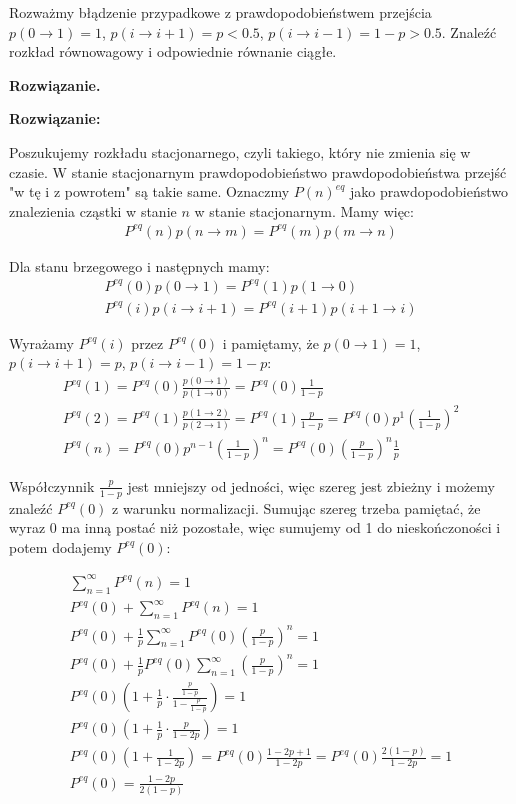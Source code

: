 \documentclass[11pt,a4paper]{article}
\newenvironment{solution}{\vspace{1cm} \par\textbf{Rozwiązanie.} \vspace{1cm}}{}
\begin{document}
Rozważmy błądzenie przypadkowe z prawdopodobieństwem przejścia 
$p(0 \to 1) = 1$, $p(i \to i+1) = p < 0.5$, $p(i \to i-1) = 1-p > 0.5$. 
Znaleźć rozkład równowagowy i odpowiednie równanie ciągłe.

\begin{solution}
    
\vspace{1cm}
{\bf Rozwiązanie:}
\vspace{1cm}

Poszukujemy rozkładu stacjonarnego, czyli takiego, który nie zmienia się w czasie.
W stanie stacjonarnym prawdopodobieństwo prawdopodobieństwa przejść "w tę i z powrotem"
są takie same. Oznaczmy $P(n)^{eq}$ jako prawdopodobieństwo znalezienia cząstki 
w stanie $n$ w stanie stacjonarnym. Mamy więc:
\begin{align*}
    P^{eq}(n) p(n \to m) = P^{eq}(m) p(m \to n)
\end{align*}

Dla stanu brzegowego i następnych mamy:
\begin{align*}
    P^{eq}(0) p(0 \to 1) = P^{eq}(1) p(1 \to 0) \\
    P^{eq}(i) p(i \to i+1) = P^{eq}(i+1) p(i+1 \to i) 
\end{align*}

Wyrażamy $P^{eq}(i)$ przez $P^{eq}(0)$ i pamiętamy, że 
$p(0 \to 1) = 1$, $p(i \to i+1) = p$, $p(i \to i-1) = 1-p$:
\begin{align*}
    P^{eq}(1) = P^{eq}(0) \frac{p(0 \to 1)}{p(1 \to 0)} = P^{eq}(0) \frac{1}{1-p} \\
    P^{eq}(2) = P^{eq}(1) \frac{p(1 \to 2)}{p(2 \to 1)} = P^{eq}(1) \frac{p}{1-p} = 
    P^{eq}(0) p^{1}\left(\frac{1}{1-p}\right)^2 \\
    P^{eq}(n) = P^{eq}(0) p^{n-1}\left(\frac{1}{1-p}\right)^n = 
    P^{eq}(0) \left(\frac{p}{1-p}\right)^{n} \frac{1}{p}
\end{align*}

Współczynnik $\frac{p}{1-p}$ jest mniejszy od jedności, 
więc szereg jest zbieżny i możemy znaleźć $P^{eq}(0)$ z warunku normalizacji.
Sumując szereg trzeba pamiętać, że wyraz 0 ma inną postać niż pozostałe,
więc sumujemy od 1 do nieskończoności i potem dodajemy $P^{eq}(0)$:


\begin{align*}
    \sum_{n=1}^{\infty} P^{eq}(n) = 1 \\
    P^{eq}(0) + \sum_{n=1}^{\infty} P^{eq}(n) = 1 \\
    P^{eq}(0) + \frac{1}{p}\sum_{n=1}^{\infty} P^{eq}(0) \left(\frac{p}{1-p}\right)^{n} = 1\\
    P^{eq}(0) + \frac{1}{p} P^{eq}(0) \sum_{n=1}^{\infty} \left(\frac{p}{1-p}\right)^{n} = 1\\
    P^{eq}(0) \left(1 + \frac{1}{p} \cdot \frac{\frac{p}{1-p}}{1 - \frac{p}{1-p}}\right) = 1 \\
    P^{eq}(0) \left(1 + \frac{1}{p} \cdot \frac{p}{1-2p}\right) = 1 \\
    P^{eq}(0) \left(1 + \frac{1}{1-2p}\right) = P^{eq}(0) \frac{1-2p + 1}{1-2p} = P^{eq}(0) \frac{2(1-p)}{1-2p} = 1 \\
    P^{eq}(0) = \frac{1-2p}{2(1-p)}
\end{align*}


\end{solution}
\end{document}
